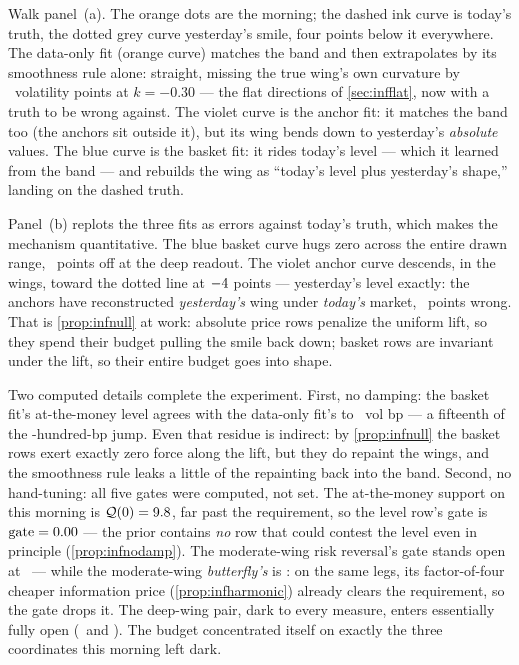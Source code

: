 Walk panel~(a).  The orange dots are the morning; the dashed ink
curve is today's truth, the dotted grey curve yesterday's smile,
four points below it everywhere.  The data-only fit (orange curve)
matches the band and then extrapolates by its smoothness rule alone:
straight, missing the true wing's own curvature by
\MacPriorJumpDataErrDeep\ volatility points at $k=-0.30$ --- the
flat directions of \cref{sec:infflat}, now with a truth to be wrong
against.  The violet curve is the anchor fit: it matches the band
too (the anchors sit outside it), but its wing bends down to
yesterday's \emph{absolute} values.  The blue curve is the basket
fit: it rides today's level --- which it learned from the band ---
and rebuilds the wing as ``today's level plus yesterday's shape,''
landing on the dashed truth.

Panel~(b) replots the three fits as errors against today's truth,
which makes the mechanism quantitative.  The blue basket curve hugs
zero across the entire drawn range,
\MacPriorJumpBasketErrDeep\ points off at the deep readout.  The
violet anchor curve descends, in the wings, toward the dotted line
at $-4$ points --- yesterday's level exactly: the
anchors have reconstructed \emph{yesterday's} wing under
\emph{today's} market, \MacPriorJumpAnchorErrDeep\ points wrong.
That is \cref{prop:infnull} at work: absolute price rows
penalize the uniform lift, so they spend their budget pulling the
smile back down; basket rows are invariant under the lift, so their
entire budget goes into shape.

Two computed details complete the experiment.  First, no damping: the basket
fit's at-the-money level agrees with the data-only fit's to
\MacPriorJumpAtmGapBp\ vol bp --- a fifteenth of the
\MacPriorJumpPts-hundred-bp jump.  Even that residue is indirect:
by \cref{prop:infnull} the basket rows exert exactly zero force
along the lift, but they do repaint the wings, and the smoothness
rule leaks a little of the repainting back into the band.  Second,
no hand-tuning: all five gates were computed, not set.  The
at-the-money support on this morning is
$\mathcal{Q}(0)=9.8$, far past the requirement, so
the level row's gate is $\operatorname{gate}=0.00$
--- the prior contains \emph{no} row that could contest the level
even in principle (\cref{prop:infnodamp}).  The moderate-wing risk
reversal's gate stands open at \MacPriorJumpGateRr\ --- while the
moderate-wing \emph{butterfly's} is \MacPriorJumpGateBfMod: on the
same legs, its factor-of-four cheaper information price
(\cref{prop:infharmonic}) already clears the requirement, so the
gate drops it.  The deep-wing pair, dark to every measure, enters
essentially fully open (\MacPriorJumpGateRrDeep\ and
\MacPriorJumpGateBfDeep).  The budget concentrated itself on
exactly the three coordinates this morning left dark.

